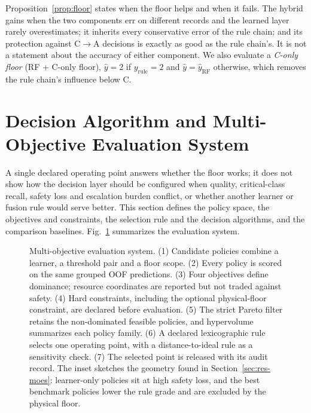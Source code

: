 \documentclass[journal]{IEEEtran}
\newcommand{\CtoA}{C$\rightarrow$A}
\begin{document}
Proposition~\ref{prop:floor} states when the floor helps and when it fails. The hybrid gains when the two components err on different records and the learned layer rarely overestimates; it inherits every conservative error of the rule chain; and its protection against \CtoA{} decisions is exactly as good as the rule chain's. It is not a statement about the accuracy of either component. We also evaluate a \emph{C-only floor} (RF + C-only floor), $\hat y=2$ if $y_{\mathrm{rule}}=2$ and $\hat y=\hat y_{\mathrm{RF}}$ otherwise, which removes the rule chain's influence below C.


\section{Decision Algorithm and Multi-Objective Evaluation System}
\label{sec:moes}
A single declared operating point answers whether the floor works; it does not show how the decision layer should be configured when quality, critical-class recall, safety loss and escalation burden conflict, or whether another learner or fusion rule would serve better. This section defines the policy space, the objectives and constraints, the selection rule and the decision algorithms, and the comparison baselines. Fig.~\ref{fig:moes} summarizes the evaluation system.

\begin{figure}[t]
\centering

\caption{Multi-objective evaluation system. (1) Candidate policies combine a learner, a threshold pair and a floor scope. (2) Every policy is scored on the same grouped OOF predictions. (3) Four objectives define dominance; resource coordinates are reported but not traded against safety. (4) Hard constraints, including the optional physical-floor constraint, are declared before evaluation. (5) The strict Pareto filter retains the non-dominated feasible policies, and hypervolume summarizes each policy family. (6) A declared lexicographic rule selects one operating point, with a distance-to-ideal rule as a sensitivity check. (7) The selected point is released with its audit record. The inset sketches the geometry found in Section~\ref{sec:res-moes}: learner-only policies sit at high safety loss, and the best benchmark policies lower the rule grade and are excluded by the physical floor.}
\label{fig:moes}
\end{figure}
\end{document}
